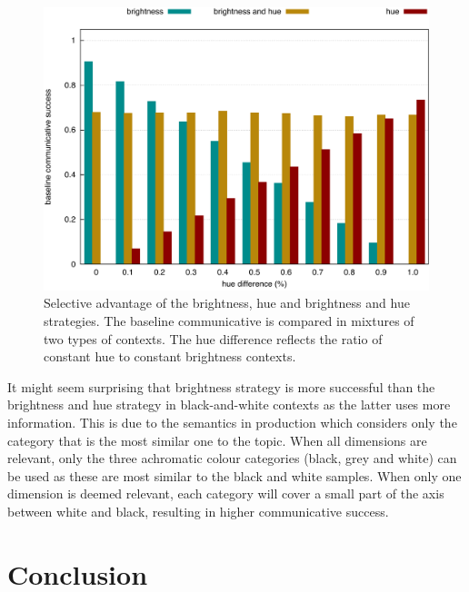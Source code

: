 \begin{figure}[htbp]
\begin{center}
  \includegraphics[width=.8\textwidth]{./selection/figures/selective-advantage.pdf}
\end{center}
\caption[Selective advantage of basic colour strategies]{Selective
  advantage of the brightness, hue and brightness and
  hue strategies. The baseline communicative is compared in
  mixtures of two types of contexts. The hue difference reflects the
  ratio of constant hue to constant brightness contexts.}
\label{f:ls-selective-advantage}
\end{figure}

It might seem surprising that brightness strategy is more
successful than the brightness and hue strategy in black-and-white
contexts as the latter uses more information. This is due to the
semantics in production which considers only the category that is the
most similar one to the topic. When all dimensions are relevant, only the
three achromatic colour categories (black, grey and white) can be used
as these are most similar to the black and white samples. When
only one dimension is deemed relevant, each category will cover a
small part of the axis between white and black, resulting in higher
communicative success.

\section{Conclusion}
\label{s:ls-conclusions}

